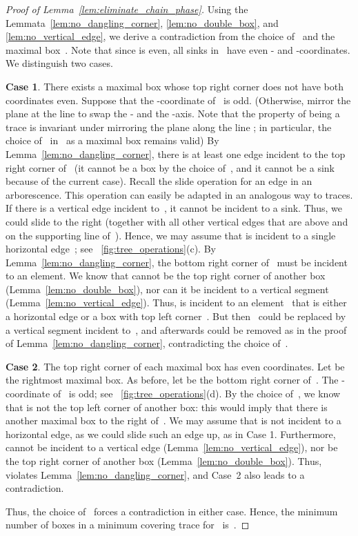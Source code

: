 \documentclass[a4paper,11pt]{article}
\begin{document}
\begin{proof}[Proof of Lemma~\ref{lem:eliminate_chain_phase}]
Using the Lemmata~\ref{lem:no_dangling_corner}, \ref{lem:no_double_box}, and \ref{lem:no_vertical_edge}, we derive a contradiction from the choice of~ and the maximal box~.
Note that since  is even, all sinks in~ have even - and -coordinates.
We distinguish two cases.

\noindent\textbf{Case 1}.
There exists a maximal box  whose top right corner  does 
not have both coordinates even.
Suppose that the -coordinate of~ is odd. (Otherwise, 
mirror the plane at the line  to swap the - and the -axis.
Note that the property of being a trace is invariant under mirroring 
the plane along the line ;
in particular, the choice of~ in~ as a maximal box remains valid)
By Lemma~\ref{lem:no_dangling_corner},
there is at least one edge incident to the top right corner of~ 
(it cannot be a box by the choice of~, and it cannot be a sink 
because of the current case). 
Recall the slide operation for an edge in an arborescence. This operation 
can easily be adapted in an analogous way to traces.
If there is a vertical edge  incident to~, it cannot be incident
to a sink. Thus, we could slide  
to the right (together with all other 
vertical edges that are above  and on the supporting line of~).
Hence, we may assume that  is incident to a single horizontal edge~;
see \figurename~\ref{fig:tree_operations}(c).
By Lemma~\ref{lem:no_dangling_corner}, the bottom right corner  
of~ must be incident to an element.
We know that  cannot be the top right corner of another box 
(Lemma~\ref{lem:no_double_box}), nor can it be incident to a vertical
segment (Lemma~\ref{lem:no_vertical_edge}). Thus,  is incident to
an element~ that is either a horizontal edge or a box with top left corner~.
But then~ could be replaced by a vertical segment  incident to~,
and afterwards   could be removed as in the proof of
Lemma~\ref{lem:no_dangling_corner}, contradicting the choice of~.

\noindent\textbf{Case 2}.
The top right corner of each maximal box has even coordinates.
Let  be the rightmost maximal box.
As before, let  be the bottom right corner of~.
The -coordinate of~ is odd; see \figurename~\ref{fig:tree_operations}(d).
By the choice of~, we know that  is not the top left corner of another box: this would imply that there is another maximal box to the right of~.
We may assume that  is not incident to a horizontal edge, as we could slide such an edge up, as in Case 1.
Furthermore,  cannot be incident to a vertical edge (Lemma~\ref{lem:no_vertical_edge}), nor be the top right corner of another box (Lemma~\ref{lem:no_double_box}).
Thus,  violates Lemma~\ref{lem:no_dangling_corner}, and Case~2 also leads to a contradiction.

Thus, the choice of~ forces a contradiction in either case.
Hence, the minimum number of boxes in a minimum covering trace for~ is~.
\end{proof}
\end{document}
